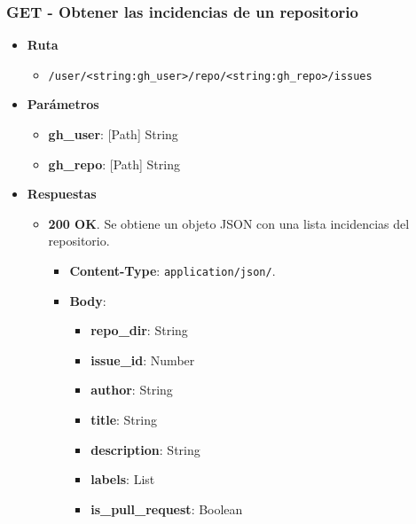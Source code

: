 \subsubsection{GET - Obtener las incidencias de un repositorio}

\begin{itemize}
    \item[] \textbf{Ruta}
        \begin{itemize} \setlength\itemsep{0.2em}
            \item[] \texttt{/user/<string:gh\_user>/repo/<string:gh\_repo>/issues}
        \end{itemize}
    \item[] \textbf{Parámetros}
        \begin{itemize} \setlength\itemsep{0.2em}
            \item[] \textbf{gh\_user}: [Path] String
            \item[] \textbf{gh\_repo}: [Path] String
        \end{itemize}
    \item[] \textbf{Respuestas}
        \begin{itemize} \setlength\itemsep{0.2em}
            \item[] \textbf{200 OK}. Se obtiene un objeto JSON con una lista incidencias del repositorio.
                \begin{itemize} \setlength\itemsep{0.2em}
                    \item[] \textbf{Content-Type}: \texttt{application/json/}.
                    \item[] \textbf{Body}: 
                        \begin{itemize} \setlength\itemsep{0.2em}
                            \item[] \textbf{repo\_dir}: String
                            \item[] \textbf{issue\_id}: Number
                            \item[] \textbf{author}: String
                            \item[] \textbf{title}: String
                            \item[] \textbf{description}: String
                            \item[] \textbf{labels}: List
                            \item[] \textbf{is\_pull\_request}: Boolean
                        \end{itemize}
                \end{itemize}

\end{itemize}
\end{itemize}
